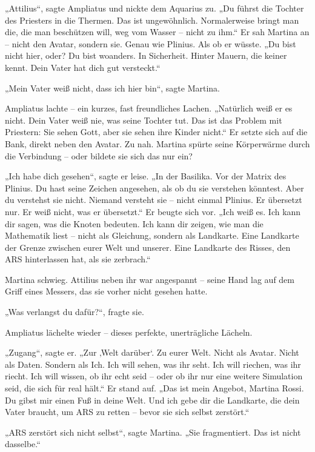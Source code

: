 \documentclass[
]{article}
\begin{document}
„Attilius``, sagte Ampliatus und nickte dem Aquarius zu. „Du führst die Tochter des Priesters in die Thermen. Das ist ungewöhnlich. Normalerweise bringt man die, die man beschützen will, weg vom Wasser -- nicht zu ihm.`` Er sah Martina an -- nicht den Avatar, sondern sie. Genau wie Plinius. Als ob er wüsste. „Du bist nicht hier, oder? Du bist woanders. In Sicherheit. Hinter Mauern, die keiner kennt. Dein Vater hat dich gut versteckt.``

„Mein Vater weiß nicht, dass ich hier bin``, sagte Martina.

Ampliatus lachte -- ein kurzes, fast freundliches Lachen. „Natürlich weiß er es nicht. Dein Vater weiß nie, was seine Tochter tut. Das ist das Problem mit Priestern: Sie sehen Gott, aber sie sehen ihre Kinder nicht.`` Er setzte sich auf die Bank, direkt neben den Avatar. Zu nah. Martina spürte seine Körperwärme durch die Verbindung -- oder bildete sie sich das nur ein?

„Ich habe dich gesehen``, sagte er leise. „In der Basilika. Vor der Matrix des Plinius. Du hast seine Zeichen angesehen, als ob du sie verstehen könntest. Aber du verstehst sie nicht. Niemand versteht sie -- nicht einmal Plinius. Er übersetzt nur. Er weiß nicht, was er übersetzt.`` Er beugte sich vor. „Ich weiß es. Ich kann dir sagen, was die Knoten bedeuten. Ich kann dir zeigen, wie man die Mathematik liest -- nicht als Gleichung, sondern als Landkarte. Eine Landkarte der Grenze zwischen eurer Welt und unserer. Eine Landkarte des Risses, den ARS hinterlassen hat, als sie zerbrach.``

Martina schwieg. Attilius neben ihr war angespannt -- seine Hand lag auf dem Griff eines Messers, das sie vorher nicht gesehen hatte.

„Was verlangst du dafür?{\kern0pt}``, fragte sie.

Ampliatus lächelte wieder -- dieses perfekte, unerträgliche Lächeln.

„Zugang``, sagte er. „Zur ‚Welt darüber`. Zu eurer Welt. Nicht als Avatar. Nicht als Daten. Sondern als Ich. Ich will sehen, was ihr seht. Ich will riechen, was ihr riecht. Ich will wissen, ob ihr echt seid -- oder ob ihr nur eine weitere Simulation seid, die sich für real hält.`` Er stand auf. „Das ist mein Angebot, Martina Rossi. Du gibst mir einen Fuß in deine Welt. Und ich gebe dir die Landkarte, die dein Vater braucht, um ARS zu retten -- bevor sie sich selbst zerstört.``

„ARS zerstört sich nicht selbst``, sagte Martina. „Sie fragmentiert. Das ist nicht dasselbe.``
\end{document}

